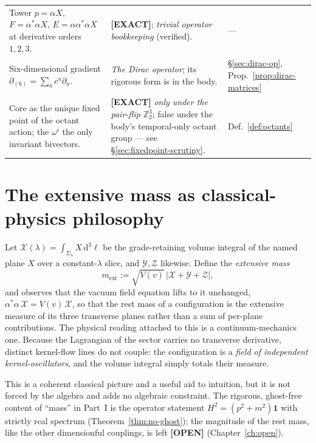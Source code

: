 \documentclass[11pt,oneside]{book}
\newcommand{\Zt}{\mathbb{Z}_2}
\newcommand{\dd}{\mathrm{d}}
\newcommand{\status}[1]{{\sffamily\bfseries\color{statuscol}[#1]}}
\theoremstyle{plain}
\theoremstyle{definition}
\theoremstyle{remark}
\begin{document}
{\begin{longtable}{@{}p{} p{} p{}@{}}
Tower $p=\alpha X$, $F=\alpha^*\alpha X$, $E=\alpha\alpha^*\alpha X$ at derivative orders
 $1,2,3$.
 & \status{EXACT}; \emph{trivial operator bookkeeping} (verified).
 & ---\\[2pt]
Six-dimensional gradient $\partial_{(6)}=\sum_a e^a\partial_a$.
 & \emph{The Dirac operator}; its rigorous form is in the body.
 & \S\ref{sec:dirac-op}, Prop.~\ref{prop:dirac-matrices}\\[2pt]
Core as the unique fixed point of the octant action; the $\omega^i$ the only invariant
 bivectors.
 & \status{EXACT} \emph{only under the pair-flip} $\Zt^{3}$; false under the body's
 temporal-only octant group --- see \S\ref{sec:fixedpoint-scrutiny}.
 & Def.~\ref{def:octants}\\
\bottomrule
\end{longtable}
}

\section{The extensive mass as classical-physics philosophy}
\label{sec:extmass-phil}
Let $\mathcal X(\lambda)=\int_{\Sigma_\lambda}X\,\dd^3\ell$ be the grade-retaining volume
integral of the named plane $X$ over a constant-$\lambda$ slice, and $\mathcal Y,\mathcal Z$
likewise. Define the \emph{extensive mass}
\[
  m_{\mathrm{ext}}:=\sqrt{V(v)}\,\bigl\lvert\mathcal X+\mathcal Y+\mathcal Z\bigr\rvert,
\]
and observes that the vacuum field equation lifts to it unchanged,
$\alpha^*\alpha\,\mathcal X=V(v)\,\mathcal X$, so that the rest mass of a configuration is the
extensive measure of its three transverse planes rather than a sum of per-plane
contributions. The physical reading attached to this is a continuum-mechanics one. Because
the Lagrangian of the sector carries no transverse derivative, distinct kernel-flow lines do
not couple: the configuration is a \emph{field of independent kernel-oscillators}, and the
volume integral simply totals their measure.

This is a coherent classical picture and a useful aid to intuition, but it is not forced by
the algebra and adds no algebraic constraint. The rigorous, ghost-free content of ``mass'' in
Part~I is the operator statement $H^2=(p^2+m^2)\mathbf 1$ with strictly real spectrum
(Theorem~\ref{thm:no-ghost}); the magnitude of the rest mass, like the other dimensionful
couplings, is left \status{OPEN} (Chapter~\ref{ch:open}).

\end{document}
